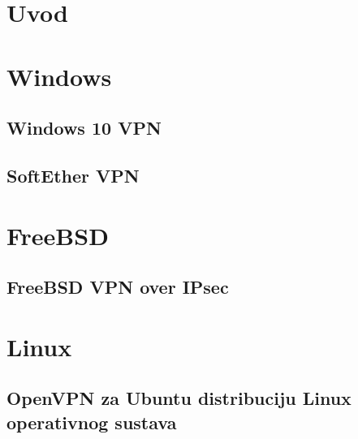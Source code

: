 \documentclass[a4paper, 12pt]{article}
\begin{document}
\thispagestyle{fancy}
	

	\addtocounter{page}{1}

	\newpage
	\tableofcontents
	
	\newpage
	\section{Uvod}
	

	\newpage
	\section{Windows}
	\subsection{Windows 10 VPN}
	
	
	\newpage
	\subsection{SoftEther VPN}
	
	
	\newpage
	\section{FreeBSD}
	\subsection{FreeBSD VPN over IPsec}
	

	\newpage
	\section{Linux}
	\subsection{OpenVPN za Ubuntu distribuciju Linux operativnog sustava}
	

	\newpage
	
	
	
\end{document}
